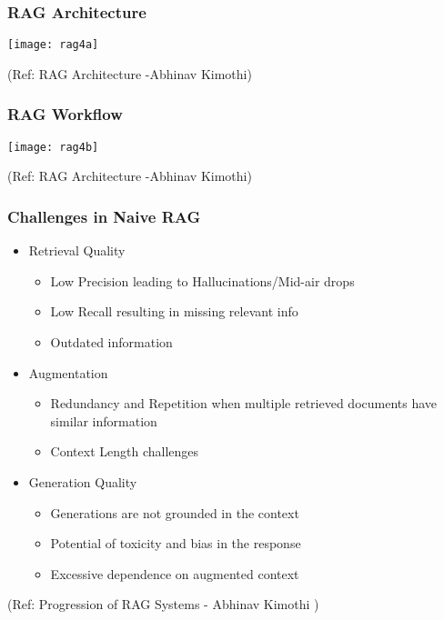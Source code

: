 \begin{frame}[fragile]\frametitle{RAG Architecture}


		\begin{center}
		\texttt{[image: rag4a]}
		\end{center}

{\tiny (Ref: RAG Architecture -Abhinav  Kimothi)}

\end{frame}

\begin{frame}[fragile]\frametitle{RAG Workflow}


		\begin{center}
		\texttt{[image: rag4b]}
		\end{center}

{\tiny (Ref: RAG Architecture -Abhinav  Kimothi)}

\end{frame}


\begin{frame}[fragile]\frametitle{Challenges in Naive RAG}

\begin{itemize}
\item Retrieval Quality
	\begin{itemize}
	\item Low Precision leading to Hallucinations/Mid-air drops
	\item Low  Recall  resulting in  missing  relevant info
	\item Outdated information
	\end{itemize}
\item Augmentation
	\begin{itemize}
	\item Redundancy and Repetition when multiple retrieved documents have similar information
	\item Context Length challenges
	\end{itemize}
\item Generation Quality
	\begin{itemize}
	\item Generations are not grounded in the context 
	\item Potential of toxicity and bias in the response
	\item Excessive dependence on augmented context
	\end{itemize}
\end{itemize}	


{\tiny (Ref: Progression of RAG Systems - Abhinav Kimothi )}

\end{frame}

